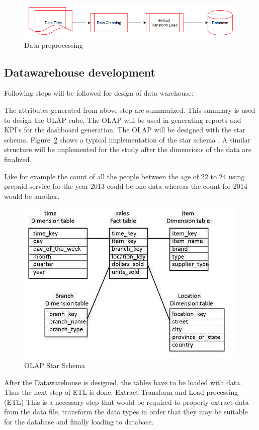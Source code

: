 \begin{figure}[h]
	\includegraphics[scale = 0.5]{figures/dataloadprocess.png}
	\centering
	\caption{Data preprocessing}
	\label{fig:dataprerocessing}
\end{figure}


\subsection{Datawarehouse development}
Following steps will be followed for design of data warehouse:

The attributes generated from above step are summarized. This summary is used to design the OLAP cube. The OLAP will be used in generating reports and KPI's for the dashboard generation. The OLAP will be designed with the star schema. Figure~\ref{fig:olapstarschema} shows a typical implementation of the star schema . A similar structure will be implemented for the study after the dimensions of the data are finalized.

Like for example the count of all the people between the age of 22 to 24 using prepaid service for the year 2013 could be one data whereas the count for 2014 would be another.

 \begin{figure}[h]
 	\includegraphics[scale = 0.7]{figures/olap_start_schema.jpg}
 	\centering
 	\caption{OLAP Star Schema}
 	\label{fig:olapstarschema}
 \end{figure}


After the Datawarehouse is designed, the tables have to be loaded with data. Thus the next step of ETL is done.
Extract Transform and Load processing (ETL) This is a necessary step that would be required to properly extract data from the data file, transform the data types in order that they may be suitable for the database and finally loading to database.
 
